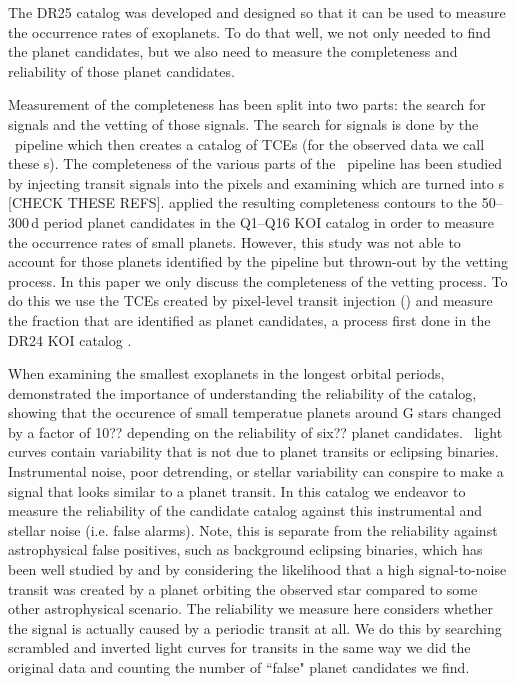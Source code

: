 The DR25 catalog was developed and designed so that it can be used to measure the occurrence rates of exoplanets. To do that well, we not only needed to find the planet candidates, but we also need to measure the completeness and reliability of those planet candidates.

Measurement of the completeness has been split into two parts: the search for signals and the vetting of those signals. The search for signals is done by the \Kepler\ pipeline which then creates a catalog of TCEs (for the observed data we call these \opstce s).  The completeness of the various parts of the \Kepler\ pipeline has been studied by injecting transit signals into the pixels and examining which are turned into \opstce s \citep{Christiansen2015b,Christiansen2013a}[CHECK THESE REFS]. \citet{Burke2015} applied the resulting completeness contours to the 50--300\,d period planet candidates in the Q1--Q16 KOI catalog \citep{Mullally2015cat} in order to measure the occurrence rates of small planets. However, this study was not able to account for those planets identified by the pipeline but thrown-out by the vetting process. In this paper we only discuss the completeness of the vetting process. To do this we use the TCEs created by pixel-level transit injection (\injtce) and measure the fraction that are identified as planet candidates, a process first done in the DR24 KOI catalog \citet{Coughlin2016}.

When examining the smallest exoplanets in the longest orbital periods, \citet{Burke2015} demonstrated the importance of understanding the reliability of the catalog, showing that the occurence of small temperatue planets around G stars changed by a factor of 10?? depending on the reliability of six?? planet candidates. \Kepler\ light curves contain variability that is not due to planet transits or eclipsing binaries.  Instrumental noise, poor detrending, or stellar variability can conspire to make a signal that looks similar to a planet transit. In this catalog we endeavor to measure the reliability of the candidate catalog against this instrumental and stellar noise (i.e. false alarms).  Note, this is separate from the reliability against astrophysical false positives, such as background eclipsing binaries, which has been well studied by \citet{Morton2016} and \citet{Torres2012} by considering the likelihood that a high signal-to-noise transit was created by a planet orbiting the observed star compared to some other astrophysical scenario.  The reliability we measure here considers whether the signal is actually caused by a periodic transit at all. We do this by searching scrambled and inverted \Kepler light curves for transits in the same way we did the original data and counting the number of ``false" planet candidates we find.


